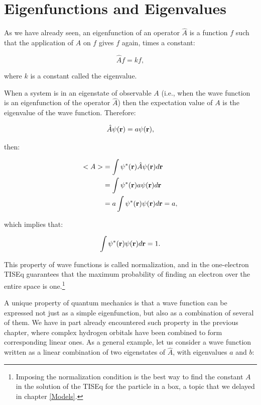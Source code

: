 \documentclass[
  9pt,
]{extbook}
\theoremstyle{definition}
\theoremstyle{definition}
\theoremstyle{definition}
\theoremstyle{remark}
\begin{document}
\hypertarget{eigenfunctions-and-eigenvalues}{%
\section{Eigenfunctions and Eigenvalues}\label{eigenfunctions-and-eigenvalues}}

As we have already seen, an eigenfunction of an operator \(\hat{A}\) is a function \(f\) such that the application of \(\hat{A}\) on \(f\) gives \(f\) again, times a constant:

\begin{equation}
\hat{A} f = k f,
\label{eq:ee1}
\end{equation}

where \(k\) is a constant called the eigenvalue.

When a system is in an eigenstate of observable \(A\) (i.e., when the wave function is an eigenfunction of the operator \(\hat{A}\)) then the expectation value of \(A\) is the eigenvalue of the wave function. Therefore:

\begin{equation}
\hat{A} \psi({\bf r}) = a \psi({\bf r}),
\label{eq:ee2}
\end{equation}

then:

\begin{equation}
\begin{aligned}
<A> &= \int \psi^{*}({\bf r}) \hat{A} \psi({\bf r}) d{\bf r} \\
&= \int \psi^{*}({\bf r}) a \psi({\bf r}) d{\bf r} \\    
&= a \int \psi^{*}({\bf r}) \psi({\bf r}) d{\bf r} = a,  
\end{aligned}
\label{eq:ee3}
\end{equation}

which implies that:

\begin{equation}
\int \psi^{*}({\bf r}) \psi({\bf r}) d{\bf r} = 1.
\label{eq:ee4}
\end{equation}

This property of wave functions is called normalization, and in the one-electron TISEq guarantees that the maximum probability of finding an electron over the entire space is one.\footnote{Imposing the normalization condition is the best way to find the constant \(A\) in the solution of the TISEq for the particle in a box, a topic that we delayed in chapter \ref{Models}.}

A unique property of quantum mechanics is that a wave function can be expressed not just as a simple eigenfunction, but also as a combination of several of them. We have in part already encountered such property in the previous chapter, where complex hydrogen orbitals have been combined to form corresponding linear ones. As a general example, let us consider a wave function written as a linear combination of two eigenstates of \(\hat{A}\), with eigenvalues \(a\) and \(b\):
\end{document}
